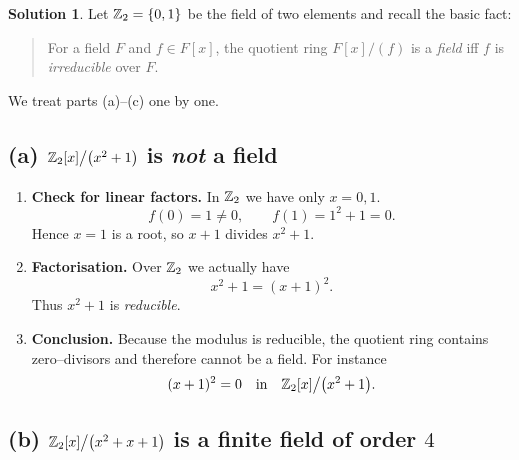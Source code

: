\documentclass[12pt]{article}
\theoremstyle{definition} %
\newtheorem{solution}{Solution}
\theoremstyle{plain} %
\begin{document}
    \begin{solution}
      Let $\Bbb Z_{2}=\{0,1\}$ be the field of two elements and recall the basic fact:
      
      \begin{quote}
      For a field $F$ and $f\in F[x]$, the quotient ring $F[x]/(f)$ is a \emph{field}  
      iff $f$ is \emph{irreducible} over $F$.
      \end{quote}
      
      We treat parts (a)–(c) one by one.
      
      \subsection*{(a)  $\Bbb Z_{2}[x]\bigl/\bigl(x^{2}+1\bigr)$ is \emph{not} a field}
      
      \begin{enumerate}[label=\textbf{Step \arabic*:}, leftmargin=*]
        \item \textbf{Check for linear factors.}  
              In $\Bbb Z_{2}$ we have only $x=0,1$.  
              \[
                f(0)=1\neq0,
                \qquad
                f(1)=1^{2}+1=0.
              \]
              Hence $x=1$ is a root, so $x+1$ divides $x^{2}+1$.
        \item \textbf{Factorisation.}  
              Over $\Bbb Z_{2}$ we actually have
              \[
                x^{2}+1=(x+1)^{2}.
              \]
              Thus $x^{2}+1$ is \emph{reducible}.
        \item \textbf{Conclusion.}  
              Because the modulus is reducible, the quotient ring contains
              zero–divisors and therefore cannot be a field.  
              For instance
              \[
                (x+1)^{2}=0\quad\text{in}\quad
                \Bbb Z_{2}[x]\bigl/\bigl(x^{2}+1\bigr).
              \]
      \end{enumerate}
      
      \subsection*{(b)  $\Bbb Z_{2}[x]\bigl/\bigl(x^{2}+x+1\bigr)$ is a finite field of order $4$}
      

\end{solution}
\end{document}
